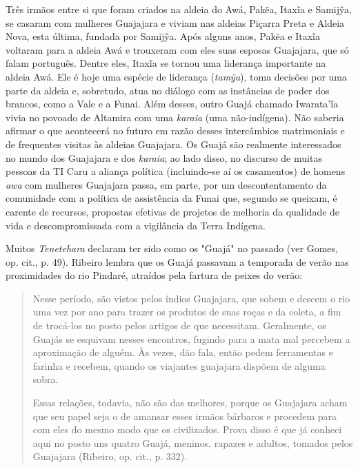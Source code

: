 Três irmãos entre si que foram criados na aldeia do Awá, Pakẽa, Itaxĩa e
Samijỹa, se casaram com mulheres Guajajara e viviam nas aldeias Piçarra
Preta e Aldeia Nova, esta última, fundada por Samijỹa. Após alguns anos,
Pakẽa e Itaxĩa voltaram para a aldeia Awá e trouxeram com eles suas
esposas Guajajara, que só falam português. Dentre eles, Itaxĩa se tornou
uma liderança importante na aldeia Awá. Ele é hoje uma espécie de
liderança (\emph{tamỹa}), toma decisões por uma parte da aldeia e,
sobretudo, atua no diálogo com as instâncias de poder dos brancos, como
a Vale e a Funai. Além desses, outro Guajá chamado Iwarata'ĩa vivia no
povoado de Altamira com uma \emph{karaia} (uma não-indígena). Não
saberia afirmar o que acontecerá no futuro em razão desses intercâmbios
matrimoniais e de frequentes visitas às aldeias Guajajara. Os Guajá são
realmente interessados no mundo dos Guajajara e dos \emph{karaia}; ao
lado disso, no discurso de muitas pessoas da TI Caru a aliança política
(incluindo-se aí os casamentos) de homens \emph{awa} com mulheres
Guajajara passa, em parte, por um descontentamento da comunidade com a
política de assistência da Funai que, segundo se queixam, é carente de
recursos, propostas efetivas de projetos de melhoria da qualidade de
vida e descompromissada com a vigilância da Terra Indígena.

Muitos \emph{Tenetehara} declaram ter sido como os "Guajá" no passado
(ver Gomes, op. cit., p. 49). Ribeiro lembra que os Guajá passavam a
temporada de verão nas proximidades do rio Pindaré, atraídos pela
fartura de peixes do verão:

\begin{quote}
Nesse período, são vistos pelos índios Guajajara, que sobem e descem o
rio uma vez por ano para trazer os produtos de suas roças e da coleta, a
fim de trocá-los no posto pelos artigos de que necessitam. Geralmente,
os Guajás se esquivam nesses encontros, fugindo para a mata mal percebem
a aproximação de alguém. Às vezes, dão fala, então pedem ferramentas e
farinha e recebem, quando os viajantes guajajara dispõem de alguma
sobra.

Essas relações, todavia, não são das melhores, porque os Guajajara acham
que seu papel seja o de amansar esses irmãos bárbaros e procedem para
com eles do mesmo modo que os civilizados. Prova disso é que já conheci
aqui no posto uns quatro Guajá, meninos, rapazes e adultos, tomados
pelos Guajajara (Ribeiro, op. cit., p. 332).
\end{quote}


